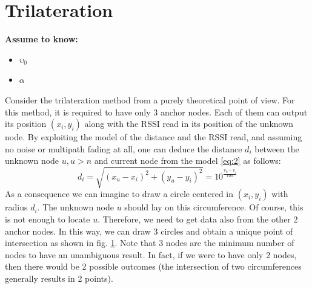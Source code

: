 \documentclass[12pt]{report}
\begin{document}
\clearpage
\section{Trilateration}
  \begin{center}
  \textbf{Assume to know:}
  \begin{itemize}
    \centering
    \item $\upsilon_0$
    \item $\alpha$
  \end{itemize}
  \end{center}
Consider the trilateration method from a purely theoretical point of view. For this method, it is required to have only 3 anchor nodes. Each of them can output its position $(x_i,y_i)$ along with the RSSI read in its position of the unknown node. By exploiting the model of the distance and the RSSI read, and assuming no noise or multipath fading at all, one can deduce the distance $d_i$ between the unknown node $u, u>n$ and current node from the model \ref{eq:2} as follows:  
\begin{equation}
    d_i=\sqrt{(x_u-x_i)^2+(y_u-y_i)^2}=10^{\frac{\upsilon_0-\upsilon_i}{10\alpha}}   
    \label{eq:18}
\end{equation}
As a consequence we can imagine to draw a circle centered in $(x_i,y_i)$ with radius $d_i$. The unknown node $u$ should lay on this circumference. Of course, this is not enough to locate $u$. Therefore, we need to get data also from the other 2 anchor nodes. In this way, we can draw 3 circles and obtain a unique point of intersection as shown in fig. \ref{fig:trilOK}. Note that 3 nodes are the minimum number of nodes to have an unambiguous result. In fact, if we were to have only 2 nodes, then there would be 2 possible outcomes (the intersection of two circumferences generally results in 2 points).
\begin{figure}
    \centering
    \caption{}
    \label{fig:trilOK}
\end{figure}
\end{document}
